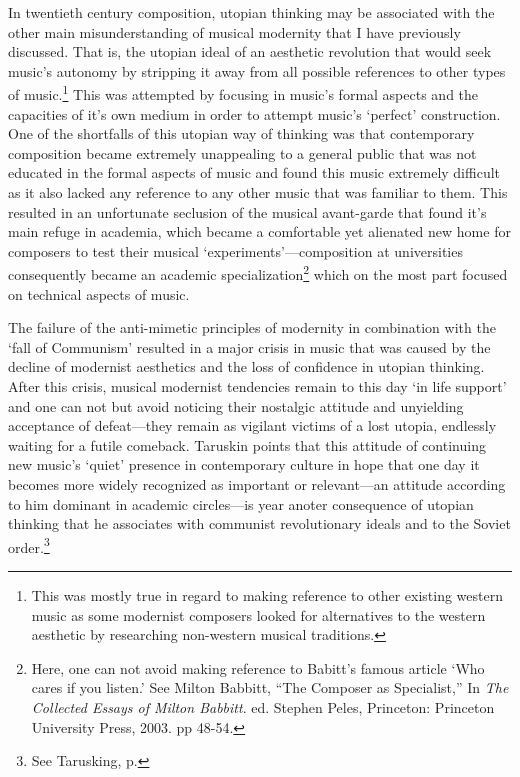 In twentieth century composition, utopian thinking may be associated with the other main misunderstanding of musical modernity that I have previously discussed. That is, the utopian ideal of an aesthetic revolution that would seek music's autonomy by stripping it away from all possible references to other types of music.\footnote{This was mostly true in regard to making reference to other existing western music as some modernist composers looked for alternatives to the western aesthetic by researching non-western musical traditions.} This was attempted by focusing in music's formal aspects and the capacities of it's own medium in order to attempt music's `perfect' construction. One of the shortfalls of this utopian way of thinking was that contemporary composition became extremely unappealing to a general public that was not educated in the formal aspects of music and found this music extremely difficult as it also lacked any reference to any other music that was familiar to them. This resulted in an unfortunate seclusion of the musical avant-garde that found it's main refuge in academia, which became a comfortable yet alienated new home for composers to test their musical `experiments'---composition at universities consequently became an academic specialization\footnote{Here, one can not avoid making reference to Babitt's famous article `Who cares if you listen.' See Milton Babbitt, ``The Composer as Specialist,'' In \emph{The Collected Essays of Milton Babbitt}.  ed. Stephen Peles,  Princeton: Princeton University Press, 2003. pp 48-54.} which on the most part focused on technical aspects of music. 

The failure of the anti-mimetic principles of modernity in combination with the `fall of Communism' resulted in a major crisis in music that was caused by the decline of modernist aesthetics and the loss of confidence in utopian thinking. After this crisis, musical modernist tendencies remain to this day `in life support' and one can not but avoid noticing their nostalgic attitude and unyielding acceptance of defeat---they remain as vigilant victims of a lost utopia, endlessly waiting for a futile comeback. Taruskin points that this attitude of continuing new music's `quiet' presence in contemporary culture in hope that one day it becomes more widely recognized as important or relevant---an attitude according to him dominant in academic circles---is year anoter consequence of utopian thinking that he associates with communist revolutionary ideals and to the Soviet order.\footnote{See Tarusking, p.}

